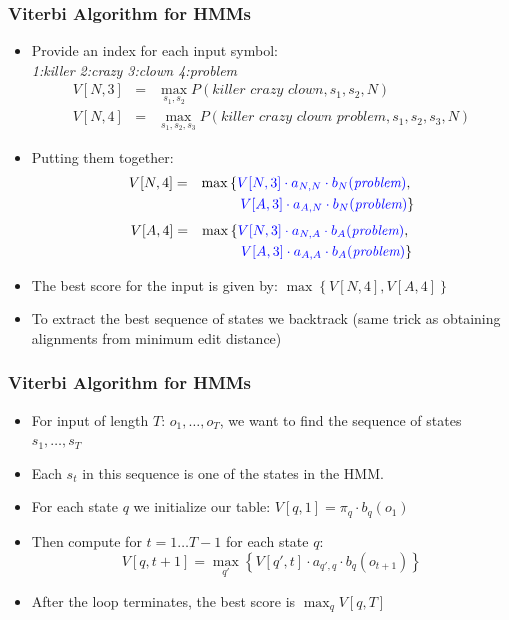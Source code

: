 \begin{frame}
\frametitle{Viterbi Algorithm for HMMs}
\begin{itemize}[<+->]
\item Provide an index for each input symbol:\\
 {\it 1:killer 2:crazy 3:clown 4:problem} 
\begin{eqnarray*}
V[N, 3] &=& \max_{s_1, s_2} P(\textit{killer crazy clown}, s_1, s_2, N) \\
V[N, 4] &=& \max_{s_1, s_2, s_3} P(\textit{killer crazy clown problem}, s_1, s_2, s_3, N)
\end{eqnarray*}

\item Putting them together:
\begin{eqnarray*}
V[N,4] &=& \max \left\{ {\color{blue} V[N,3] \cdot a_{N,N} \cdot b_N(\textit{problem}) }, \right.\\
&& \left. {\color{blue} V[A,3] \cdot a_{A,N} \cdot b_N(\textit{problem}) } \right\}
\end{eqnarray*}
\begin{eqnarray*}
V[A,4] &=& \max \left\{ {\color{blue} V[N,3] \cdot a_{N,A} \cdot b_A(\textit{problem}) }, \right.\\
&& \left. {\color{blue} V[A,3] \cdot a_{A,A} \cdot b_A(\textit{problem}) } \right\}
\end{eqnarray*}
\item The best score for the input is given by:
\( \max \left\{ V[N,4] , V[A,4] \right\} \)
\item To extract the best sequence of states we backtrack (same trick as obtaining alignments from minimum edit distance)
\end{itemize}
\end{frame}

\begin{frame}
\frametitle{Viterbi Algorithm for HMMs}
\begin{itemize}[<+->]
\item For input of length $T$: $o_1, \ldots, o_T$, we want to find the sequence of states $s_1, \ldots, s_T$
\item Each $s_t$ in this sequence is one of the states in the HMM.
\item For each state $q$ we initialize our table: $V[q,1] = \pi_q \cdot b_q(o_1)$ 
\item Then compute for $t = 1 \ldots T-1$ for each state $q$:
\[ V[q, t+1] = \max_{q'} \left\{ V[q', t] \cdot a_{q',q} \cdot b_q(o_{t+1}) \right\} \]
\item After the loop terminates, the best score is $\max_q V[q,T]$
\end{itemize}
\end{frame}

